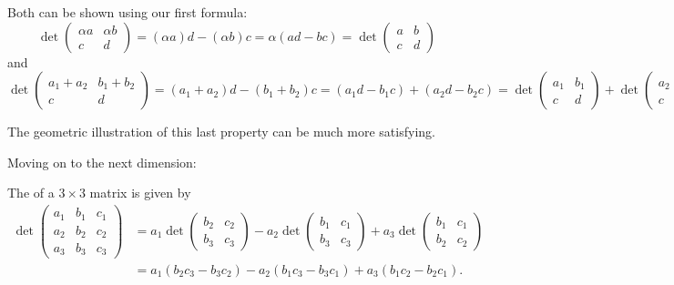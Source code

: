 \documentclass{ximera}
\begin{document}
Both can be shown using our first formula:
\[
  \det
  \begin{pmatrix}
    \alpha a & \alpha b \\
    c & d
  \end{pmatrix}
  = (\alpha a)d - (\alpha b)c
  = \alpha (ad - bc)
  = \det
  \begin{pmatrix}
    a & b \\
    c & d
  \end{pmatrix}
\]
and
\[
  \det
  \begin{pmatrix}
    a_1 + a_2 & b_1 + b_2 \\
    c & d
  \end{pmatrix}
  = (a_1 + a_2) d - (b_1 + b_2) c
  = (a_1 d - b_1 c) + (a_2 d - b_2 c)
  = \det
  \begin{pmatrix}
    a_1 & b_1 \\
    c & d
  \end{pmatrix}
  + \det
  \begin{pmatrix}
    a_2 & b_2 \\
    c & d
  \end{pmatrix}.
\]

The geometric illustration of this last property can be much more satisfying.



Moving on to the next dimension:
\begin{definition}
  The  of a $3 \times 3$ matrix is given by
  \begin{align*}
    \det\begin{pmatrix}
      a_1 &  b_1 & c_1 \\
      a_2 &  b_2 & c_2 \\
      a_3 &  b_3 & c_3
    \end{pmatrix}
    & =
      a_1 \det
      \begin{pmatrix}
        b_2 & c_2 \\
        b_3 & c_3
      \end{pmatrix}
      - a_2 \det
      \begin{pmatrix}
        b_1 & c_1 \\
        b_3 & c_3
      \end{pmatrix}
      + a_3 \det
      \begin{pmatrix}
        b_1 & c_1 \\
        b_2 & c_2
      \end{pmatrix} \\
          & = a_1(b_2c_3 - b_3c_2) - a_2(b_1c_3 - b_3c_1) + a_3(b_1c_2 - b_2c_1).
  \end{align*}
\end{definition}
\end{document}
